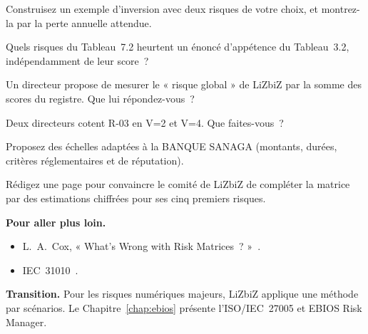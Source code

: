 \begin{boxexo}[title={\ding{45}\quad Exercice~7.5. Inversion \niveaumoyen}]
Construisez un exemple d'inversion avec deux risques de votre choix, et
montrez-la par la perte annuelle attendue.
\end{boxexo}

\begin{boxexo}[title={\ding{45}\quad Exercice~7.6. Appétence \niveaumoyen}]
Quels risques du Tableau~7.2 heurtent un énoncé d'appétence du
Tableau~3.2, indépendamment de leur score~?
\end{boxexo}

\begin{boxexo}[title={\ding{45}\quad Exercice~7.7. Additionner \niveaumoyen}]
Un directeur propose de mesurer le « risque global » de LiZbiZ par la somme
des scores du registre. Que lui répondez-vous~?
\end{boxexo}

\begin{boxexo}[title={\ding{45}\quad Exercice~7.8. Reproductibilité \niveaumoyen}]
Deux directeurs cotent R-03 en V=2 et V=4. Que faites-vous~?
\end{boxexo}

\begin{boxexo}[title={\ding{45}\quad Exercice~7.9. Une échelle bancaire \niveauexpert}]
Proposez des échelles adaptées à la BANQUE SANAGA (montants, durées,
critères réglementaires et de réputation).
\end{boxexo}

\begin{boxexo}[title={\ding{45}\quad Exercice~7.10. Au-delà de la matrice \niveauexpert}]
Rédigez une page pour convaincre le comité de LiZbiZ de compléter la
matrice par des estimations chiffrées pour ses cinq premiers risques.
\end{boxexo}

\bigskip

\begin{boxinfo}
\textbf{Pour aller plus loin.}
\begin{itemize}
    \item L.~A.~Cox, « What's Wrong with Risk Matrices~? »~\cite{cox2008matrices}.
    \item IEC~31010~\cite{iec31010}.
\end{itemize}
\end{boxinfo}

\begin{boxinfo}
\textbf{Transition.} Pour les risques numériques majeurs, LiZbiZ applique
une méthode par scénarios. Le Chapitre~\ref{chap:ebios} présente
l'ISO/IEC~27005 et EBIOS Risk Manager.
\end{boxinfo}
